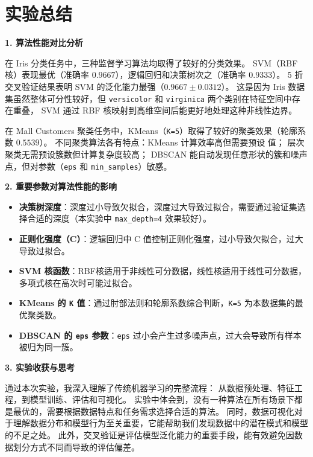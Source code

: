 \documentclass[UTF8]{ctexart}
\begin{document}
\section{实验总结}

\textbf{1. 算法性能对比分析}

在 Iris 分类任务中，三种监督学习算法均取得了较好的分类效果。
SVM（RBF 核）表现最优（准确率 $0.9667$），逻辑回归和决策树次之（准确率 $0.9333$）。
5 折交叉验证结果表明 SVM 的泛化能力最强（$0.9667\pm0.0312$）。
这是因为 Iris 数据集虽然整体可分性较好，但 \texttt{versicolor} 和 \texttt{virginica} 两个类别在特征空间中存在重叠，
SVM 通过 RBF 核映射到高维空间后能更好地处理这种非线性边界。

在 Mall Customers 聚类任务中，KMeans（\texttt{K=5}）取得了较好的聚类效果（轮廓系数 $0.5539$）。
不同聚类算法各有特点：KMeans 计算效率高但需要预设  值；
层次聚类无需预设簇数但计算复杂度较高；
DBSCAN 能自动发现任意形状的簇和噪声点，但对参数（\texttt{eps} 和 \texttt{min\_samples}）敏感。

\textbf{2. 重要参数对算法性能的影响}

\begin{itemize}
\item \textbf{决策树深度}：深度过小导致欠拟合，深度过大导致过拟合，需要通过验证集选择合适的深度（本实验中 \texttt{max\_depth=4} 效果较好）。
\item \textbf{正则化强度（C）}：逻辑回归中 C 值控制正则化强度，过小导致欠拟合，过大导致过拟合。
\item \textbf{SVM 核函数}：RBF核适用于非线性可分数据，线性核适用于线性可分数据，多项式核在高次时可能过拟合。
\item \textbf{KMeans 的 \texttt{K} 值}：通过肘部法则和轮廓系数综合判断，\texttt{K=5} 为本数据集的最优聚类数。
\item \textbf{DBSCAN 的 \texttt{eps} 参数}：\texttt{eps} 过小会产生过多噪声点，过大会导致所有样本被归为同一簇。
\end{itemize}

\textbf{3. 实验收获与思考}

通过本次实验，我深入理解了传统机器学习的完整流程：
从数据预处理、特征工程，到模型训练、评估和可视化。
实验中体会到，没有一种算法在所有场景下都是最优的，需要根据数据特点和任务需求选择合适的算法。
同时，数据可视化对于理解数据分布和模型行为至关重要，它能帮助我们发现数据中的潜在模式和模型的不足之处。
此外，交叉验证是评估模型泛化能力的重要手段，能有效避免因数据划分方式不同而导致的评估偏差。
\end{document}
